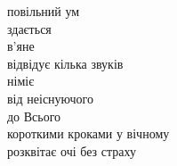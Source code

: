 повільний ум\\

здається\\
в'яне\\

відвідує кілька звуків\\
німіє\\

від неіснуючого\\
до Всього\\

короткими кроками у вічному\\
розквітає очі без страху\\
